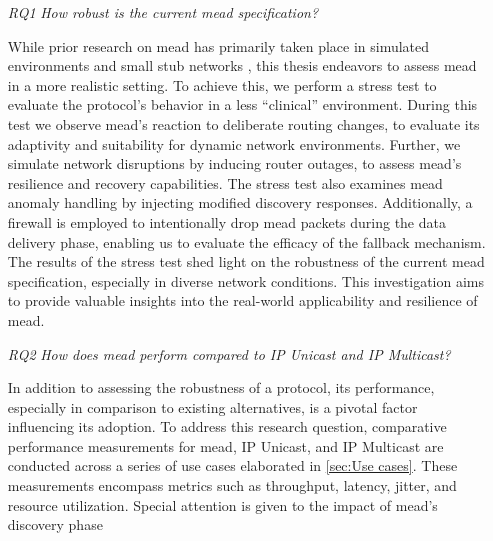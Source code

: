 \begin{enumerate}
    \item[\textit{RQ1}]\label{rq1}
        \textit{How robust is the current \gls{mead} specification?}\par
        While prior research on \gls{mead} has primarily taken place in simulated
            environments \cite{meadcast1, meadcast2} and small stub networks
            \cite{sdn_ba}, this thesis endeavors to assess \gls{mead} in a more
            realistic setting.
        To achieve this, we perform a stress test to evaluate the protocol's
            behavior in a less ``clinical'' environment.
        During this test we observe \gls{mead}'s reaction to deliberate routing
            changes, to evaluate its adaptivity and suitability for dynamic
            network environments.
        Further, we simulate network disruptions by inducing router outages, to
            assess \gls{mead}'s resilience and recovery capabilities.
        The stress test also examines \gls{mead} anomaly handling by injecting
            modified discovery responses.
        Additionally, a firewall is employed to intentionally drop \gls{mead}
            packets during the data delivery phase, enabling us to evaluate the
            efficacy of the fallback mechanism.
        The results of the stress test shed light on the robustness of the
            current \gls{mead} specification, especially in diverse network
            conditions.
        This investigation aims to provide valuable insights into the
            real-world applicability and resilience of \gls{mead}.
        \item[\textit{RQ2}]\label{rq2}
        \textit{How does \gls{mead} perform compared to IP Unicast and
        IP Multicast?}\par
        In addition to assessing the robustness of a protocol, its performance,
            especially in comparison to existing alternatives, is a pivotal
            factor influencing its adoption.
        To address this research question, comparative performance measurements
            for \gls{mead}, IP Unicast, and IP Multicast are conducted across a
            series of use cases elaborated in \autoref{sec:Use cases}.
        These measurements encompass metrics such as throughput, latency,
            jitter, and resource utilization.
        Special attention is given to the impact of \gls{mead}'s discovery phase

\end{enumerate}
